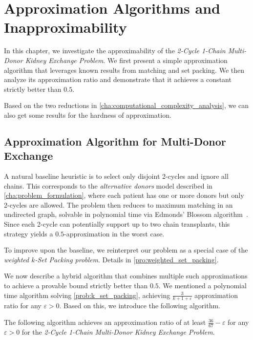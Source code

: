 \chapter{Approximation Algorithms and Inapproximability}
\label{cha:approximation}

In this chapter, we investigate the approximability of the \textit{2-Cycle 1-Chain Multi-Donor Kidney Exchange Problem}. We first present a simple approximation algorithm that leverages known results from matching and set packing. We then analyze its approximation ratio and demonstrate that it achieves a constant strictly better than $0.5$.

Based on the two reductions in \autoref{cha:computational_complexity_analysis}, we can also get some results for the  hardness of approximation.


\section{Approximation Algorithm for Multi-Donor Exchange}

A natural baseline heuristic is to select only disjoint 2-cycles and ignore all chains. This corresponds to the \emph{alternative donors} model described in \autoref{cha:problem_formulation}, where each patient has one or more donors but only 2-cycles are allowed. The problem then reduces to maximum matching in an undirected graph, solvable in polynomial time via Edmonds' Blossom algorithm~\cite{edmonds1965paths}. Since each 2-cycle can potentially support up to two chain transplants, this strategy yields a $0.5$-approximation in the worst case.

To improve upon the baseline, we reinterpret our problem as a special case of the \textit{weighted $k$-Set Packing problem}. Details in \autoref{pro:weighted_set_packing}. %

We now describe a hybrid algorithm that combines multiple such approximations to achieve a provable bound strictly better than $0.5$. 
We mentioned a polynomial time algorithm solving \autoref{prob:k_set_packing}, achieving $\frac{3}{k + 1 + \varepsilon}$ approximation ratio for any $\varepsilon > 0$. Based on this, we introduce the following algorithm.

\begin{lemma}
The following algorithm achieves an approximation ratio of at least $\frac{36}{67} - \varepsilon$ for any $\varepsilon > 0$ for the \textit{2-Cycle 1-Chain Multi-Donor Kidney Exchange Problem}.
\end{lemma}

